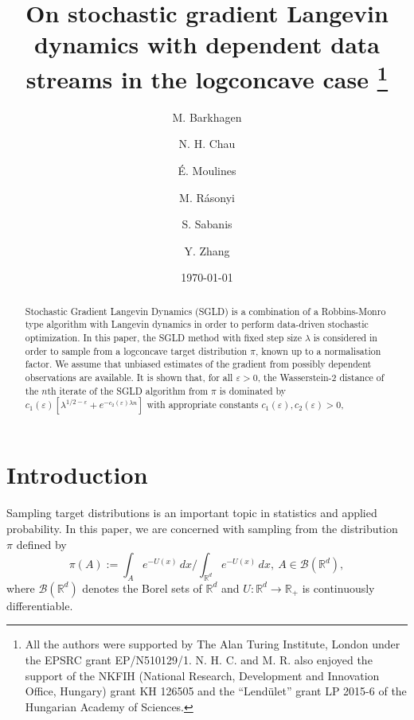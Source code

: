 \documentclass[a4paper]{article}
\begin{document}
\title{On stochastic gradient Langevin dynamics with dependent data streams
in the logconcave case
	\thanks{All the authors were supported by The Alan Turing Institute, London under the EPSRC grant EP/N510129/1. N. H. C. and M. R. also enjoyed the support of the NKFIH (National Research, Development and Innovation Office, Hungary) grant KH 126505 and the ``Lend\"ulet'' grant LP 2015-6 of the Hungarian Academy of Sciences.} }
\author{M. Barkhagen \and N. H. Chau \and \'E. Moulines \and
M. R\'asonyi \and S. Sabanis \and Y. Zhang}

\date{\today}

\maketitle

\begin{abstract}
Stochastic Gradient Langevin Dynamics (SGLD) is a combination of a Robbins-Monro type algorithm with Langevin dynamics in order to perform data-driven stochastic optimization. In this paper, the SGLD method with fixed step size $\lambda$
is considered in order to sample from a logconcave target distribution $\pi$, known up to a normalisation factor. We assume that unbiased estimates of the gradient from possibly dependent observations are available. It is shown that,
for all $\varepsilon>0$, the 
Wasserstein-$2$ distance of the $n$th iterate of the SGLD algorithm from
$\pi$ is dominated by
$c_1(\varepsilon)[\lambda^{1/2 - \varepsilon}+e^{-c_2(\varepsilon)\lambda n}]$ with appropriate 
constants $c_1(\varepsilon), c_2(\varepsilon)>0$, 
\end{abstract}

\section{Introduction}

Sampling target distributions is an important topic in statistics and applied probability. %
In this paper, we are concerned with sampling from the distribution $\pi$ defined by
$$
\pi(A):=\int_A e^{-U(x)}\, dx/\int_{\mathbb{R}^{d}} e^{-U(x)}\, dx,\
A\in\mathcal{B}(\mathbb{R}^{d}),
$$
where $\mathcal{B}(\mathbb{R}^{d})$ denotes the Borel sets of $\mathbb{R}^{d}$
and $U:\mathbb{R}^{d}\to\mathbb{R}_+$ is continuously
differentiable.
\end{document}
